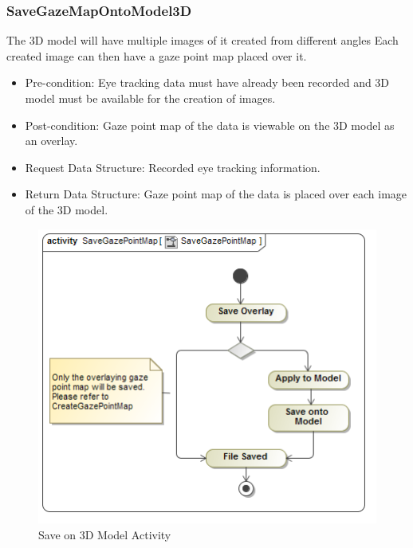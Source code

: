 	\subsubsection{SaveGazeMapOntoModel3D}
	The 3D model will have multiple images of it created from different angles Each created image can then have a gaze point map placed over it.
	\begin{itemize}
		\item Pre-condition: Eye tracking data must have already been recorded and 3D model must be available for the creation of images.
		\item Post-condition: Gaze point map of the data is viewable on the 3D model as an overlay.
		\item Request Data Structure: Recorded eye tracking information.
		\item Return Data Structure: Gaze point map of the data is placed over each image of the 3D model.
	\end{itemize}
	\begin{figure}[!ht]
		\centering	
		\includegraphics[scale=0.5,width=15cm,keepaspectratio]{Diagrams/Activity_Diagram__SaveGazePointMap__SaveGazePointMap.png}	
		\caption{Save on 3D Model Activity}
	\end{figure}	
	
		
